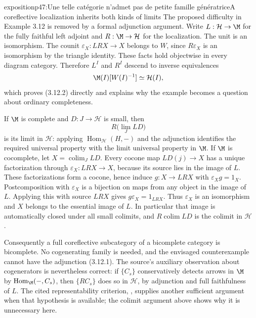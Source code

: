 \begin{dcomment}{exposition}{p47:Une telle catégorie n'admet pas de petite famille génératrice}{A coreflective localization inherits both kinds of limits}
The proposed difficulty in Example 3.12 is removed by a formal adjunction argument. Write $L:\mathcal H\to\M$ for the fully faithful left adjoint and $R:\M\to\mathcal H$ for the localization. The unit is an isomorphism. The counit $\varepsilon_X:LRX\to X$ belongs to $W$, since $R\varepsilon_X$ is an isomorphism by the triangle identity. These facts hold objectwise in every diagram category. Therefore $L^I$ and $R^I$ descend to inverse equivalences
\[
 \M(I)[W(I)^{-1}]\simeq\mathcal H(I),
\]
which proves (3.12.2) directly and explains why the example becomes a question about ordinary completeness.

If $\M$ is complete and $D:J\to\mathcal H$ is small, then
\[
 R\bigl(\lim_J LD\bigr)
\]
is its limit in $\mathcal H$: applying $\operatorname{Hom}_{\mathcal H}(H,-)$ and the adjunction identifies the required universal property with the limit universal property in $\M$. If $\M$ is cocomplete, let $X=\operatorname{colim}_J LD$. Every cocone map $LD(j)\to X$ has a unique factorization through $\varepsilon_X:LRX\to X$, because its source lies in the image of $L$. These factorizations form a cocone, hence induce $g:X\to LRX$ with $\varepsilon_Xg=1_X$. Postcomposition with $\varepsilon_X$ is a bijection on maps from any object in the image of $L$. Applying this with source $LRX$ gives $g\varepsilon_X=1_{LRX}$. Thus $\varepsilon_X$ is an isomorphism and $X$ belongs to the essential image of $L$. In particular that image is automatically closed under all small colimits, and $R\operatorname{colim}LD$ is the colimit in $\mathcal H$.

Consequently a full coreflective subcategory of a bicomplete category is bicomplete. No cogenerating family is needed, and the envisaged counterexample cannot have the adjunction (3.12.1). The source's auxiliary observation about cogenerators is nevertheless correct: if $\{C_s\}$ conservatively detects arrows in $\M$ by $\operatorname{Hom}_{\M}(-,C_s)$, then $\{RC_s\}$ does so in $\mathcal H$, by adjunction and full faithfulness of $L$. The cited representability criterion, \citet[Expos\'e~I, 8.12.7]{SGA4I1972}, supplies another sufficient argument when that hypothesis is available; the colimit argument above shows why it is unnecessary here.
\end{dcomment}

